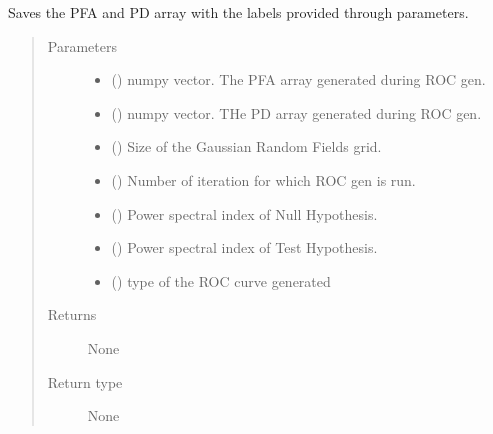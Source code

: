 \documentclass[letterpaper,10pt,english]{sphinxmanual}
\begin{document}
\begin{fulllineitems}
\label{\detokenize{utilities:utilities.SaveROC}}
\sphinxAtStartPar
Saves the PFA and PD array with the labels provided through parameters.
\begin{quote}\begin{description}
\item[{Parameters}] \leavevmode\begin{itemize}
\item {} 
\sphinxAtStartPar
{} () \textendash{} numpy vector. The PFA array generated during ROC gen.

\item {} 
\sphinxAtStartPar
{} () \textendash{} numpy vector. THe PD array generated during ROC gen.

\item {} 
\sphinxAtStartPar
{} () \textendash{} Size of the Gaussian Random Fields grid.

\item {} 
\sphinxAtStartPar
{} () \textendash{} Number of iteration for which ROC gen is run.

\item {} 
\sphinxAtStartPar
{} () \textendash{} Power spectral index of Null Hypothesis.

\item {} 
\sphinxAtStartPar
{} () \textendash{} Power spectral index of Test Hypothesis.

\item {} 
\sphinxAtStartPar
{} () \textendash{} type of the ROC curve generated

\end{itemize}

\item[{Returns}] \leavevmode
\sphinxAtStartPar
None

\item[{Return type}] \leavevmode
\sphinxAtStartPar
None

\end{description}\end{quote}

\end{fulllineitems}
\end{document}
